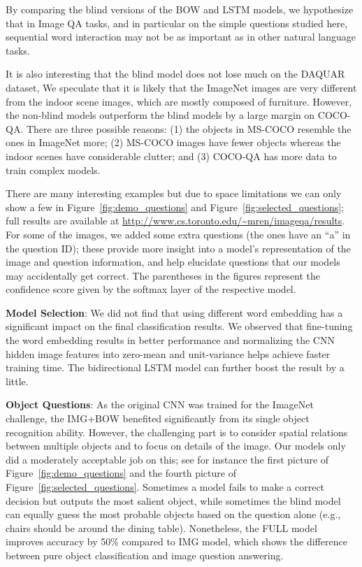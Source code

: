 By comparing the blind versions of the BOW and LSTM models, we hypothesize
that in Image QA tasks, and in particular on the simple questions studied here,
sequential word interaction may not be as important as in other natural
language tasks. 

It is also interesting that the blind model does not lose much on the DAQUAR
dataset, We speculate that it is likely that the ImageNet images are very
different from the indoor scene images, which are mostly composed of furniture.
However, the non-blind models outperform the blind models by a large margin on
COCO-QA. There are three possible reasons: (1) the objects in MS-COCO
resemble the ones in ImageNet more; (2) MS-COCO images have fewer objects
whereas the indoor scenes have considerable clutter; and (3) COCO-QA has more
data to train complex models.

There are many interesting examples but due to space limitations we can only
show a few in Figure~\ref{fig:demo_questions} and
Figure~\ref{fig:selected_questions}; full results are available at
\url{http://www.cs.toronto.edu/~mren/imageqa/results}.  For some of the
images, we added some extra questions (the ones have an ``a'' in the
question ID); these provide more insight into a model's representation of the
image and question information, and help elucidate questions that our models
may accidentally get correct. The parentheses in the figures represent the
confidence score given by the softmax layer of the respective model.

\textbf{Model Selection}: We did not find that using different word embedding
has a significant impact on the final classification results. We observed that
fine-tuning the word embedding results in better performance and normalizing
the CNN hidden image features into zero-mean and unit-variance helps achieve
faster training time. The bidirectional LSTM model can further boost the result
by a little.
 
\textbf{Object Questions}: As the original CNN was trained for the ImageNet
challenge, the IMG+BOW benefited significantly from its single object recognition
ability. However, the challenging part is to consider spatial relations between
multiple objects and to focus on details of the image. Our models only did a
moderately acceptable job on this; see for instance the first picture of
Figure~\ref{fig:demo_questions} and the fourth picture of
Figure~\ref{fig:selected_questions}. Sometimes a model fails to make a correct
decision but outputs the most salient object, while sometimes the blind model
can equally guess the most probable objects based on the question alone (e.g.,
chairs should be around the dining table). Nonetheless, the FULL model improves
accuracy by 50\% compared to IMG model, which shows the difference between pure
object classification and image question answering.


